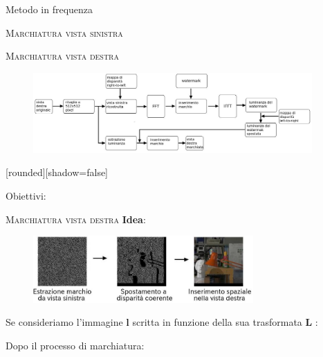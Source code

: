 \documentclass{beamer}
\begin{document}
\begin{section}{Metodo in frequenza}
\begin{frame}[t]{\textsc{Marchiatura vista sinistra}}
\end{frame}



\begin{frame}[t]{\textsc{Marchiatura vista destra}}
\begin{figure}
  \includegraphics[width=0.95\textwidth]{./img_wat/pros.jpg}  
  \label{fig:rightwat}
\end{figure}
[rounded][shadow=false]
\begin{block}{Obiettivi:}
\end{block}
\end{frame}

\begin{frame}[t]{\textsc{Marchiatura vista destra}}
\textbf{Idea}: 
\begin{figure}
  \includegraphics[width=0.75\textwidth]{./img_wat/idea.jpg}
  
  \label{fig:idea}
\end{figure}
\vspace{-3mm}
Se consideriamo l'immagine  $\mathbf{l}$ scritta in funzione della sua trasformata  $\mathbf{L}$ :
\begin{center}
\end{center}
Dopo il processo di marchiatura: 
\vspace{-1.5em}
\begin{center}
\end{center}


\end{frame}
\end{section}
\end{document}
